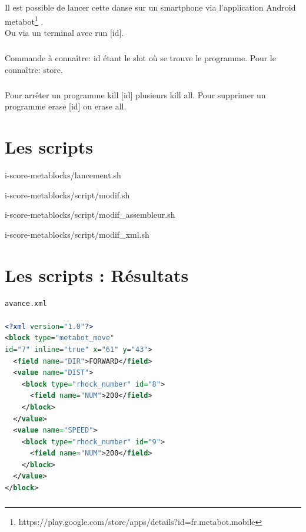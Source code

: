 \documentclass[10pt,a4paper]{report}
\begin{document}
\begin{appendices}
\paragraph{}
Il est possible de lancer cette danse sur un smartphone via l'application Android metabot\footnote{https://play.google.com/store/apps/details?id=fr.metabot.mobile} .
\\Ou via un terminal avec run [id].
\paragraph{}
Commande à connaître:
id étant le slot où se trouve le programme. Pour le connaître: store.
\paragraph{}
Pour arrêter un programme kill [id] plusieurs kill all. Pour supprimer un programme erase [id] ou erase all.

\chapter{Les scripts} 

{i-score-metablocks/lancement.sh}
\newpage

{i-score-metablocks/script/modif.sh}


{i-score-metablocks/script/modif_assembleur.sh}


{i-score-metablocks/script/modif_xml.sh}

\chapter{Les scripts : Résultats} 
\begin{lstlisting}[language=xml, frame=none]
avance.xml

<?xml version="1.0"?>
<block type="metabot_move" 
id="7" inline="true" x="61" y="43">
  <field name="DIR">FORWARD</field>
  <value name="DIST">
    <block type="rhock_number" id="8">
      <field name="NUM">200</field>
    </block>
  </value>
  <value name="SPEED">
    <block type="rhock_number" id="9">
      <field name="NUM">200</field>
    </block>
  </value>
</block>
\end{lstlisting}
\paragraph{}


\end{appendices}
\end{document}
